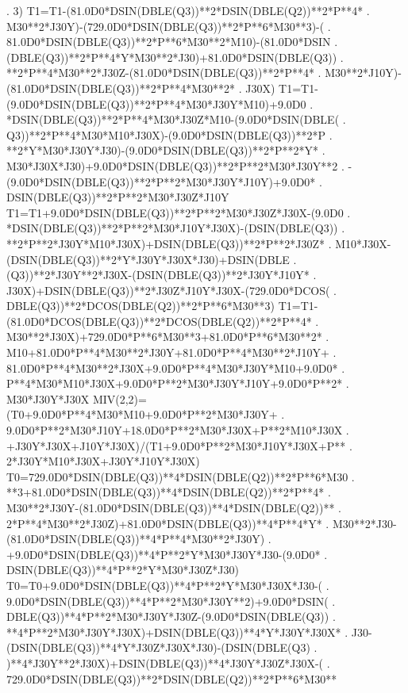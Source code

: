 \begin{framedverbatim}
     . 3)
      T1=T1-(81.0D0*DSIN(DBLE(Q3))**2*DSIN(DBLE(Q2))**2*P**4*
     . M30**2*J30Y)-(729.0D0*DSIN(DBLE(Q3))**2*P**6*M30**3)-(
     . 81.0D0*DSIN(DBLE(Q3))**2*P**6*M30**2*M10)-(81.0D0*DSIN
     . (DBLE(Q3))**2*P**4*Y*M30**2*J30)+81.0D0*DSIN(DBLE(Q3))
     . **2*P**4*M30**2*J30Z-(81.0D0*DSIN(DBLE(Q3))**2*P**4*
     . M30**2*J10Y)-(81.0D0*DSIN(DBLE(Q3))**2*P**4*M30**2*
     . J30X)
      T1=T1-(9.0D0*DSIN(DBLE(Q3))**2*P**4*M30*J30Y*M10)+9.0D0
     . *DSIN(DBLE(Q3))**2*P**4*M30*J30Z*M10-(9.0D0*DSIN(DBLE(
     . Q3))**2*P**4*M30*M10*J30X)-(9.0D0*DSIN(DBLE(Q3))**2*P
     . **2*Y*M30*J30Y*J30)-(9.0D0*DSIN(DBLE(Q3))**2*P**2*Y*
     . M30*J30X*J30)+9.0D0*DSIN(DBLE(Q3))**2*P**2*M30*J30Y**2
     . -(9.0D0*DSIN(DBLE(Q3))**2*P**2*M30*J30Y*J10Y)+9.0D0*
     . DSIN(DBLE(Q3))**2*P**2*M30*J30Z*J10Y
      T1=T1+9.0D0*DSIN(DBLE(Q3))**2*P**2*M30*J30Z*J30X-(9.0D0
     . *DSIN(DBLE(Q3))**2*P**2*M30*J10Y*J30X)-(DSIN(DBLE(Q3))
     . **2*P**2*J30Y*M10*J30X)+DSIN(DBLE(Q3))**2*P**2*J30Z*
     . M10*J30X-(DSIN(DBLE(Q3))**2*Y*J30Y*J30X*J30)+DSIN(DBLE
     . (Q3))**2*J30Y**2*J30X-(DSIN(DBLE(Q3))**2*J30Y*J10Y*
     . J30X)+DSIN(DBLE(Q3))**2*J30Z*J10Y*J30X-(729.0D0*DCOS(
     . DBLE(Q3))**2*DCOS(DBLE(Q2))**2*P**6*M30**3)
      T1=T1-(81.0D0*DCOS(DBLE(Q3))**2*DCOS(DBLE(Q2))**2*P**4*
     . M30**2*J30X)+729.0D0*P**6*M30**3+81.0D0*P**6*M30**2*
     . M10+81.0D0*P**4*M30**2*J30Y+81.0D0*P**4*M30**2*J10Y+
     . 81.0D0*P**4*M30**2*J30X+9.0D0*P**4*M30*J30Y*M10+9.0D0*
     . P**4*M30*M10*J30X+9.0D0*P**2*M30*J30Y*J10Y+9.0D0*P**2*
     . M30*J30Y*J30X
      MIV(2,2)=(T0+9.0D0*P**4*M30*M10+9.0D0*P**2*M30*J30Y+
     . 9.0D0*P**2*M30*J10Y+18.0D0*P**2*M30*J30X+P**2*M10*J30X
     . +J30Y*J30X+J10Y*J30X)/(T1+9.0D0*P**2*M30*J10Y*J30X+P**
     . 2*J30Y*M10*J30X+J30Y*J10Y*J30X)
      T0=729.0D0*DSIN(DBLE(Q3))**4*DSIN(DBLE(Q2))**2*P**6*M30
     . **3+81.0D0*DSIN(DBLE(Q3))**4*DSIN(DBLE(Q2))**2*P**4*
     . M30**2*J30Y-(81.0D0*DSIN(DBLE(Q3))**4*DSIN(DBLE(Q2))**
     . 2*P**4*M30**2*J30Z)+81.0D0*DSIN(DBLE(Q3))**4*P**4*Y*
     . M30**2*J30-(81.0D0*DSIN(DBLE(Q3))**4*P**4*M30**2*J30Y)
     . +9.0D0*DSIN(DBLE(Q3))**4*P**2*Y*M30*J30Y*J30-(9.0D0*
     . DSIN(DBLE(Q3))**4*P**2*Y*M30*J30Z*J30)
      T0=T0+9.0D0*DSIN(DBLE(Q3))**4*P**2*Y*M30*J30X*J30-(
     . 9.0D0*DSIN(DBLE(Q3))**4*P**2*M30*J30Y**2)+9.0D0*DSIN(
     . DBLE(Q3))**4*P**2*M30*J30Y*J30Z-(9.0D0*DSIN(DBLE(Q3))
     . **4*P**2*M30*J30Y*J30X)+DSIN(DBLE(Q3))**4*Y*J30Y*J30X*
     . J30-(DSIN(DBLE(Q3))**4*Y*J30Z*J30X*J30)-(DSIN(DBLE(Q3)
     . )**4*J30Y**2*J30X)+DSIN(DBLE(Q3))**4*J30Y*J30Z*J30X-(
     . 729.0D0*DSIN(DBLE(Q3))**2*DSIN(DBLE(Q2))**2*P**6*M30**

\end{framedverbatim}
